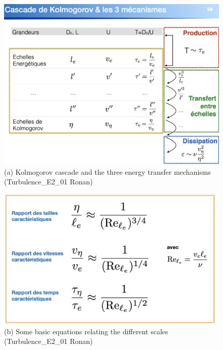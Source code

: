 \documentclass[a4paper,11pt]{article}
\begin{document}
\begin{figure}[h!]
	\centering
	\includegraphics[width=.8\linewidth]{figures/cascade.png}
	\caption{(a) Kolmogorov cascade and the three energy transfer mechanisms (Turbulence\_E2\_01 Ronan)}
\end{figure}
\begin{figure}[h!]
	\centering
	\includegraphics[width=.8\linewidth]{figures/relations.png}
	\caption{(b) Some basic equations relating the different scales (Turbulence\_E2\_01 Ronan)}
\end{figure}
\end{document}
